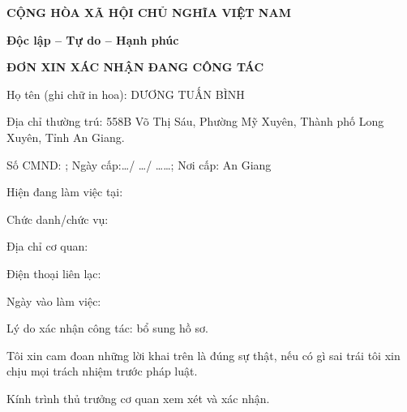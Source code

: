 \documentclass{report}
\begin{document}
\begin{center}
  \textbf{CỘNG HÒA XÃ HỘI CHỦ NGHĨA VIỆT NAM}

  \textbf{Độc lập -- Tự do -- Hạnh phúc}
  \vspace{5pt}
  \hline
  
 \large\textbf{{ĐƠN XIN XÁC NHẬN ĐANG CÔNG TÁC}}

\end{center}
\noindent

Họ tên (ghi chữ in hoa): DƯƠNG TUẤN BÌNH 

Địa chỉ thường trú: 558B Võ Thị Sáu, Phường Mỹ Xuyên, Thành phố Long Xuyên, Tỉnh An Giang.

Số CMND:	; Ngày cấp:\ldots  / \ldots / \ldots \ldots	; Nơi
cấp: An Giang


Hiện đang làm việc tại: 
	
Chức danh/chức vụ:

Địa chỉ cơ quan:
	
Điện thoại liên lạc:
	
Ngày vào làm việc:
	
Lý do xác nhận công tác: bổ sung hồ sơ.

Tôi xin cam đoan những lời khai trên là đúng sự thật, nếu có gì sai trái tôi xin chịu mọi trách nhiệm trước pháp luật.

Kính trình thủ trưởng cơ quan xem xét và xác nhận.
\end{document}
